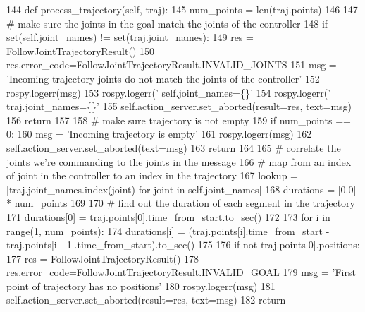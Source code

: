 \begin{DoxyCode}
144     \textcolor{keyword}{def }process\_trajectory(self, traj):
145         num\_points = len(traj.points)
146         
147         \textcolor{comment}{# make sure the joints in the goal match the joints of the controller}
148         \textcolor{keywordflow}{if} set(self.joint\_names) != set(traj.joint\_names):
149             res = FollowJointTrajectoryResult()
150             res.error\_code=FollowJointTrajectoryResult.INVALID\_JOINTS
151             msg = \textcolor{stringliteral}{'Incoming trajectory joints do not match the joints of the controller'}
152             rospy.logerr(msg)
153             rospy.logerr(\textcolor{stringliteral}{' self.joint\_names=\{\}'} %
154             rospy.logerr(\textcolor{stringliteral}{' traj.joint\_names=\{\}'} %
155             self.action\_server.set\_aborted(result=res, text=msg)
156             \textcolor{keywordflow}{return}
157             
158         \textcolor{comment}{# make sure trajectory is not empty}
159         \textcolor{keywordflow}{if} num\_points == 0:
160             msg = \textcolor{stringliteral}{'Incoming trajectory is empty'}
161             rospy.logerr(msg)
162             self.action\_server.set\_aborted(text=msg)
163             \textcolor{keywordflow}{return}
164             
165         \textcolor{comment}{# correlate the joints we're commanding to the joints in the message}
166         \textcolor{comment}{# map from an index of joint in the controller to an index in the trajectory}
167         lookup = [traj.joint\_names.index(joint) \textcolor{keywordflow}{for} joint \textcolor{keywordflow}{in} self.joint\_names]
168         durations = [0.0] * num\_points
169         
170         \textcolor{comment}{# find out the duration of each segment in the trajectory}
171         durations[0] = traj.points[0].time\_from\_start.to\_sec()
172         
173         \textcolor{keywordflow}{for} i \textcolor{keywordflow}{in} range(1, num\_points):
174             durations[i] = (traj.points[i].time\_from\_start - traj.points[i - 1].time\_from\_start).to\_sec()
175             
176         \textcolor{keywordflow}{if} \textcolor{keywordflow}{not} traj.points[0].positions:
177             res = FollowJointTrajectoryResult()
178             res.error\_code=FollowJointTrajectoryResult.INVALID\_GOAL
179             msg = \textcolor{stringliteral}{'First point of trajectory has no positions'}
180             rospy.logerr(msg)
181             self.action\_server.set\_aborted(result=res, text=msg)
182             \textcolor{keywordflow}{return}

\end{DoxyCode}
